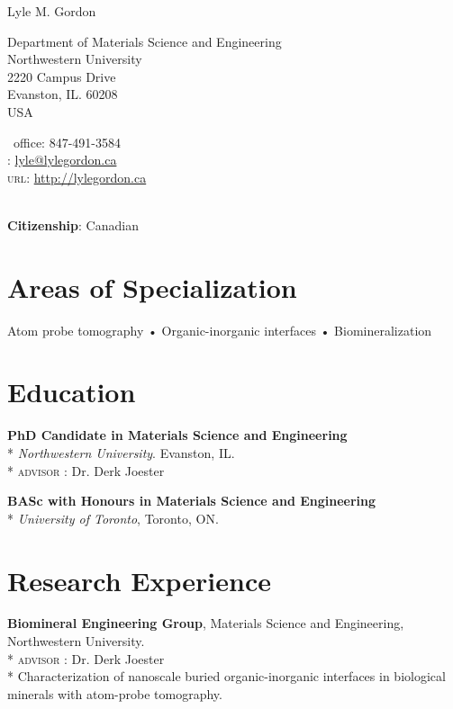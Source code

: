 \setlength\parindent{0cm}

{\LARGE Lyle M. Gordon}\\[0.6cm]

\noindent\begin{minipage}[t]{0.6\textwidth}
Department of Materials Science and Engineering\\
Northwestern University\\
2220 Campus Drive\\
Evanston, IL. 60208\\
USA
\end{minipage}%
\hfill
\begin{minipage}[t]{0.4\textwidth}
\Telefon \ {\small{office}}: 847-491-3584\\
\Letter: \href{mailto:lyle@lylegordon.ca}{lyle@lylegordon.ca}\\
\textsc{url}: \href{http://lylegordon.ca}{http://lylegordon.ca}
\end{minipage}\\[0.4cm]

\textbf{Citizenship}: Canadian

\section*{\large{Areas of Specialization}}
Atom probe tomography • Organic-inorganic interfaces • Biomineralization

\section*{Education}
\textbf{PhD Candidate in Materials Science and Engineering}\\*
\begingroup\setlength{\parskip}{0.2cm}
\emph{Northwestern University}. Evanston, IL.\\*
\textsc{advisor} : Dr. Derk Joester

\textbf{BASc with Honours in Materials Science and Engineering}\\*
\emph{University of Toronto}, Toronto, ON.
\endgroup

\section*{Research Experience}
\textbf{Biomineral Engineering Group}, Materials Science and Engineering, Northwestern University.\\*
\begingroup\setlength{\parskip}{0.2cm}
\textsc{advisor} : Dr. Derk Joester\\*
Characterization of nanoscale buried organic-inorganic interfaces in biological minerals with atom-probe tomography.

